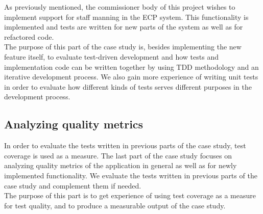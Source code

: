 As previously mentioned, the commissioner body of this project wishes to
implement support for staff manning in the ECP system. This
functionality is implemented and tests are written for new parts of the
system as well as for refactored code.\\

The purpose of this part of the case study is, besides implementing the
new feature itself, to evaluate test-driven development and how tests
and implementation code can be written together by using TDD methodology
and an iterative development process. We also gain more experience of
writing unit tests in order to evaluate how different kinds of tests
serves different purposes in the development process.\\


\subsection{Analyzing quality metrics}
\label{sec:casestudy_3}

In order to evaluate the tests written in previous parts of the case
study, test coverage is used as a measure. The last part of the case
study focuses on analyzing quality metrics of the application in general
as well as for newly implemented functionality. We evaluate the tests
written in previous parts of the case study and complement them if
needed.\\

The purpose of this part is to get experience of using test coverage as
a measure for test quality, and to produce a measurable output of the
case study.\\
